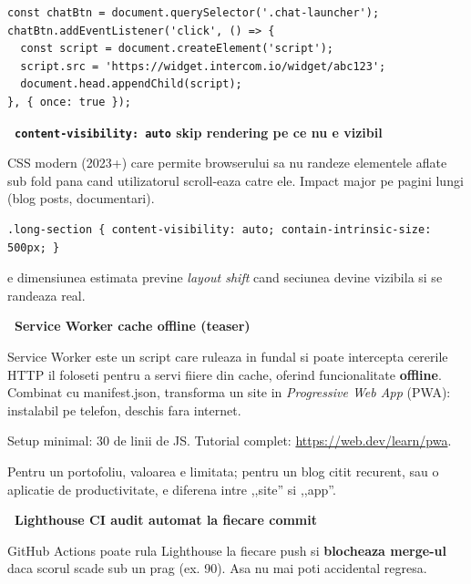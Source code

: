 \begin{bonusbox}
\begin{lstlisting}[style=js, caption={Lazy load pentru chat widget}]
const chatBtn = document.querySelector('.chat-launcher');
chatBtn.addEventListener('click', () => {
  const script = document.createElement('script');
  script.src = 'https://widget.intercom.io/widget/abc123';
  document.head.appendChild(script);
}, { once: true });
\end{lstlisting}

\medskip

\textbf{\faWifi\ \texttt{content-visibility: auto} \textendash{} skip rendering pe ce nu e vizibil}

CSS modern (2023+) care permite browserului sa nu randeze elementele aflate sub fold pana cand utilizatorul scroll-eaza catre ele. Impact major pe pagini lungi (blog posts, documentari).

\begin{lstlisting}[style=css, numbers=none]
.long-section { content-visibility: auto; contain-intrinsic-size: 500px; }
\end{lstlisting}

 e dimensiunea estimata \textendash{} previne \emph{layout shift} cand seciunea devine vizibila si se randeaza real.

\medskip

\textbf{\faServer\ Service Worker \textendash{} cache offline (teaser)}

Service Worker este un script care ruleaza in fundal si poate intercepta cererile HTTP \textendash{} il foloseti pentru a servi fiiere din cache, oferind funcionalitate \textbf{offline}. Combinat cu manifest.json, transforma un site in \emph{Progressive Web App} (PWA): instalabil pe telefon, deschis fara internet.

Setup minimal: 30 de linii de JS. Tutorial complet: \url{https://web.dev/learn/pwa}.

Pentru un portofoliu, valoarea e limitata; pentru un blog citit recurent, sau o aplicatie de productivitate, e diferena intre ,,site'' si ,,app''.

\medskip

\textbf{\faRobot\ Lighthouse CI \textendash{} audit automat la fiecare commit}

GitHub Actions poate rula Lighthouse la fiecare push si \textbf{blocheaza merge-ul} daca scorul scade sub un prag (ex. 90). Asa nu mai poti accidental regresa.


\end{bonusbox}
